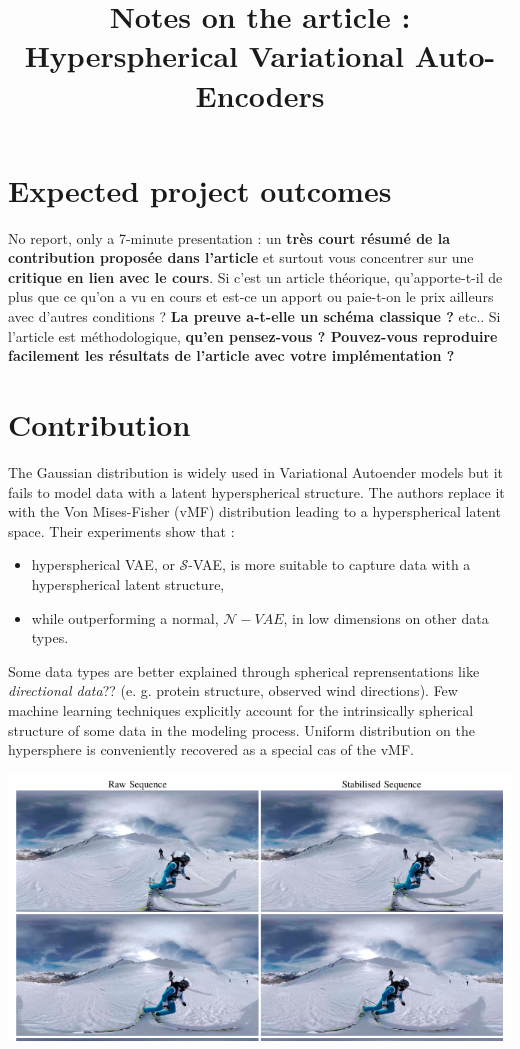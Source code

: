 \documentclass[12pt]{article}
\title{Notes on the article : Hyperspherical Variational Auto-Encoders}
\begin{document}
\maketitle

\section{Expected project outcomes}
No report, only a 7-minute presentation :
un \textbf{très court résumé de la contribution proposée dans l'article} et surtout vous concentrer sur une \textbf{critique en lien avec le cours}.
Si c'est un article théorique, qu'apporte-t-il de plus que ce qu'on a vu en cours et est-ce un apport ou paie-t-on le prix ailleurs avec d'autres conditions ? \textbf{La preuve a-t-elle un schéma classique ?} etc..
Si l'article est méthodologique, \textbf{qu'en pensez-vous ? Pouvez-vous reproduire facilement les résultats de l'article avec votre implémentation ?}

\section{Contribution}
The Gaussian distribution is widely used in Variational Autoender models but it fails to model data with a latent hyperspherical structure. The authors replace it with the Von Mises-Fisher (vMF) distribution leading to a hyperspherical latent space.
Their experiments show that :
\begin{itemize}
    \item hyperspherical VAE, or $\mathcal{S}$-VAE, is more suitable to capture data with a hyperspherical latent structure,
    \item while outperforming a normal, $\mathcal{N}-VAE$, in low dimensions on other data types.
\end{itemize}

Some data types are better explained through spherical reprensentations like \textit{directional data}?? (e. g. protein structure, observed wind directions). Few machine learning techniques explicitly account for the intrinsically spherical structure of some data in the modeling process.
Uniform distribution on the hypersphere is conveniently recovered as a special cas of the vMF.

\includegraphics[width=\textwidth]{figures/spherical_video.png}
\end{document}
